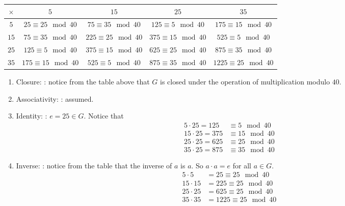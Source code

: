 \documentclass[11pt,twoside]{article}
\begin{document}
\begin{enumerate}
\begin{tabular}{ | c | c | c | c | c | }
\hline
$\times$ 		& $5$ 													& $15$  													& $25$  													& $35$\\\hline
$5$					& $25 \equiv 25 \!\mod 40$			& $75 \equiv 35 \!\mod 40$				& $125 \equiv 5 \!\mod 40$				& $175 \equiv 15 \!\mod 40$\\\hline
$15$				& $75 \equiv 35 \!\mod 40$			& $225 \equiv 25 \!\mod 40$				& $375 \equiv 15 \!\mod 40$				& $525 \equiv 5 \!\mod 40$\\\hline
$25$				& $125 \equiv 5 \!\mod 40$			& $375 \equiv 15 \!\mod 40$				&$625 \equiv 25 \!\mod 40$				& $875 \equiv 35 \!\mod 40$\\\hline
$35$				& $175 \equiv 15 \!\mod 40$			& $525 \equiv 5 \!\mod 40$				& $875 \equiv 35 \!\mod 40$				& $1225 \equiv 25 \!\mod 40$\\\hline
\end{tabular}
\begin{enumerate}
\item Closure: {\Large\color{grn}\checkmark}: notice from the table above that $G$ is closed under the operation of multiplication modulo $40$.
\item Associativity: {\Large\color{grn}\checkmark}: assumed.
\item Identity: {\Large\color{grn}\checkmark}: $e = 25 \in G$.  Notice that
\begin{align*}
5 \cdot 25 = 125 &\equiv 5 \!\mod 40\\
15 \cdot 25 = 375 &\equiv 15 \!\mod 40\\
25 \cdot 25 = 625 &\equiv 25 \!\mod 40\\
35 \cdot 25 = 875 &\equiv 35 \!\mod 40
\end{align*}
\item Inverse: {\Large\color{grn}\checkmark}: notice from the table that the inverse of $a$ is $a$.  So $a \cdot a = e$ for all $a\in G$.
\begin{align*}
5 \cdot 5 &= 25 \equiv 25 \!\mod 40\\
15 \cdot 15 &= 225 \equiv 25 \!\mod 40\\
25 \cdot 25 &= 625 \equiv 25 \!\mod 40\\
35 \cdot 35 &= 1225 \equiv 25 \!\mod 40
\end{align*}
\end{enumerate}

\vspace{0.5cm}


\end{enumerate}
\end{document}
